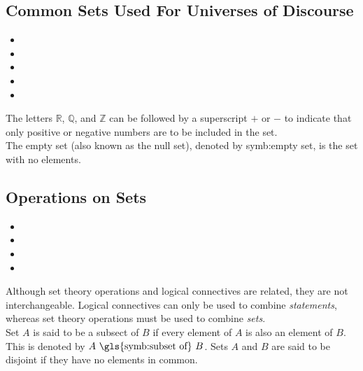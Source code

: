 \documentclass{article}
\begin{document}
\subsection{Common Sets Used For Universes of Discourse}
\begin{itemize}
    \item {}
    \item {}
    \item {}
    \item {}
    \item {}
\end{itemize}
The letters $\mathbb{R}$, $\mathbb{Q}$, and $\mathbb{Z}$ can be followed by a superscript $+$ or $-$ to indicate that only positive or negative numbers are to be included in the set.\\

\noindent The empty set (also known as the null set), denoted by \gls{symb:empty set}, is the set with no elements. 

\subsection{Operations on Sets}
\begin{itemize}
    \item {}
    \item {}
    \item {}
    \item {}
\end{itemize}
Although set theory operations and logical connectives are related, they are not interchangeable. Logical connectives can only be used to combine \textit{statements}, whereas set theory operations must be used to combine \textit{sets}.\\

\noindent Set $A$ is said to be a subsect of $B$ if every element of $A$ is also an element of $B$. This is denoted by $A \text{ \gls{symb:subset of} } B$. Sets $A$ and $B$ are said to be \gls{disjoint} if they have no elements in common.
\end{document}
